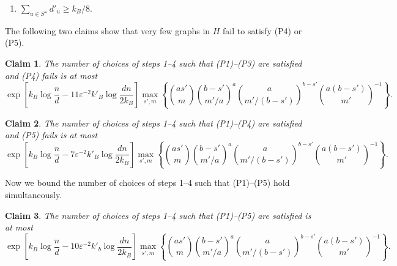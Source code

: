 \documentclass[11pt]{article}
\newcommand{\eps}{\varepsilon}
\theoremstyle{plain}
\newtheorem{claim}{Claim}[thm]
\begin{document}
\begin{enumerate}
    \item[(P5)] $\sum_{u \in S''}d'_u \geq k_B/8$. 
\end{enumerate}
The following two claims show that very few graphs in $H$ fail to satisfy (P4) or (P5).
\begin{claim}\label{clm: P4}
    The number of choices of steps 1--4 such that (P1)--(P3) are satisfied and (P4) fails is at most
    \[
    \exp\left[k_B\log\frac{n}{d}-11\eps^{-2}k'_B\log\frac{dn}{2k_B}\right]\max_{s', m}\left\{\binom{as'}{m}\binom{b - s'}{m'/a}^a\binom{a}{m'/(b - s')}^{b - s'}\binom{a(b - s')}{m'}^{-1} \right\}.
    \]
\end{claim}

\begin{claim}\label{clm: P5}
        The number of choices of steps 1--4 such that (P1)--(P4) are satisfied and (P5) fails is at most
        \[
    \exp\left[k_B\log\frac{n}{d}-7\eps^{-2}k'_B\log\frac{dn}{2k_B}\right]\max_{s', m}\left\{\binom{as'}{m}\binom{b - s'}{m'/a}^a\binom{a}{m'/(b - s')}^{b - s'}\binom{a(b - s')}{m'}^{-1} \right\}.
    \]
\end{claim}


Now we bound the number of choices of steps 1--4 such that (P1)--(P5) hold simultaneously. 

\begin{claim}\label{clm: P3}
    The number of choices of steps 1--4 such that (P1)--(P5) are satisfied is at most
    \[
    \exp\left[k_B\log\frac{n}{d} - 10\eps^{-2}k'_b\log\frac{dn}{2k_B}\right]\max_{s', m}\left\{\binom{as'}{m}\binom{b - s'}{m'/a}^a\binom{a}{m'/(b - s')}^{b - s'}\binom{a(b - s')}{m'}^{-1} \right\}.
    \]
\end{claim}
\end{document}
